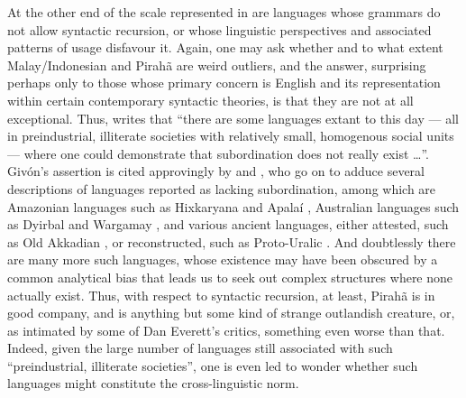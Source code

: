 \documentclass[output=paper,colorlinks,citecolor=brown
]{langscibook}
\begin{document}
At the other end of the scale represented in  are languages whose grammars do not allow syntactic recursion, or whose linguistic perspectives and associated patterns of usage disfavour it.  Again, one may ask whether and to what extent Malay/Indonesian and Pirahã are weird outliers, and the answer, surprising perhaps only to those whose primary concern is English and its representation within certain contemporary syntactic theories, is that they are not at all exceptional.  Thus, \citet[298]{givon1979understanding} writes that ``there are some languages extant to this day — all in preindustrial, illiterate societies with relatively small, homogenous social units — where one could demonstrate that subordination does not really exist  \ldots ''.  Givón's assertion is cited approvingly by \citet{pullum2010recursion} and , who go on to adduce several descriptions of languages reported as lacking subordination, among which are Amazonian languages such as Hixkaryana
\citep{derbyshire1979hixkaryana} and Apalaí \citep{koehn1986apalai}, Australian languages such as Dyirbal \citep{dixon1972dyirbal} and Wargamay \citep{dixon1981wargamay}, and various ancient languages, either attested, such as Old Akkadian \citep{deutscher2000syntactic}, or reconstructed, such as Proto-Uralic \citep{collinder1960comparative}.  And doubtlessly there are many more such languages, whose existence may have been obscured by a common analytical bias that leads us to seek out complex structures where none actually exist.  Thus, with respect to syntactic recursion, at least, Pirahã is in good company, and is anything but some kind of strange outlandish creature, or, as intimated by some of Dan Everett's critics, something even worse than that.  Indeed, given the large number of languages still associated with such ``preindustrial, illiterate societies'', one is even led to wonder whether such languages might constitute the cross-linguistic norm.
\end{document}
